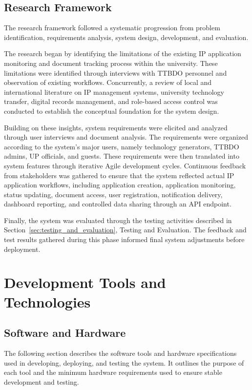 \subsection{Research Framework}
The research framework followed a systematic progression from problem identification, requirements analysis, system design, development, and evaluation.

The research began by identifying the limitations of the existing IP application monitoring and document tracking process within the university. These limitations were identified through interviews with TTBDO personnel and observation of existing workflows. Concurrently, a review of local and international literature on IP management systems, university technology transfer, digital records management, and role-based access control was conducted to establish the conceptual foundation for the system design.

Building on these insights, system requirements were elicited and analyzed through user interviews and document analysis. 
The requirements were organized according to the system's major users, namely technology generators, TTBDO admins, UP officials, and guests. These requirements were then translated into system features through iterative Agile development cycles. Continuous feedback from stakeholders was gathered to ensure that the system reflected actual IP application workflows, including application creation, application monitoring, status updating, document access, user registration, notification delivery, dashboard reporting, and controlled data sharing through an API endpoint.

Finally, the system was evaluated through the testing activities described in Section~\ref{sec:testing_and_evaluation}, Testing and Evaluation. The feedback and test results gathered during this phase informed final system adjustments before deployment.

\section{Development Tools and Technologies}

\subsection{Software and Hardware}
The following section describes the software tools and hardware specifications used in developing, deploying, and testing the system. It outlines the purpose of each tool and the minimum hardware requirements used to ensure stable development and testing.

